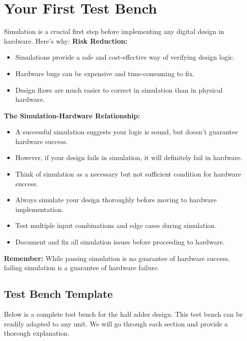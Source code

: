 \documentclass[12pt]{labmanual}
\begin{document}
\section{Your First Test Bench}
Simulation is a crucial first step before implementing any digital design in hardware. Here's why:
\hfill\break
\hfill\break
\noindent\textbf{Risk Reduction:}
\noindent
\begin{itemize}
    \item Simulations provide a safe and cost-effective way of verifying design logic.
    \item Hardware bugs can be expensive and time-consuming to fix.
    \item Design flaws are much easier to correct in simulation than in physical hardware.
\end{itemize}
\hfill\break
\hfill\break
\noindent\textbf{The Simulation-Hardware Relationship:}
\noindent
\begin{itemize}
    \item A successful simulation suggests your logic is sound, but doesn't guarantee hardware success.
    \item However, if your design fails in simulation, it will definitely fail in hardware.
    \item Think of simulation as a necessary but not sufficient condition for hardware success.
\end{itemize}
\hfill\break
\hfill\break
\noindent
\begin{important}
\begin{itemize}
    \item Always simulate your design thoroughly before moving to hardware implementation.
    \item Test multiple input combinations and edge cases during simulation.
    \item Document and fix all simulation issues before proceeding to hardware.
\end{itemize}
\textbf{Remember:} While passing simulation is no guarantee of hardware success, failing simulation is a guarantee of hardware failure.
\end{important}


\subsection{Test Bench Template}
Below is a complete test bench for the half adder design. This test bench can be readily adapted to any unit. We will go through each section and provide a thorough explanation.
\end{document}

